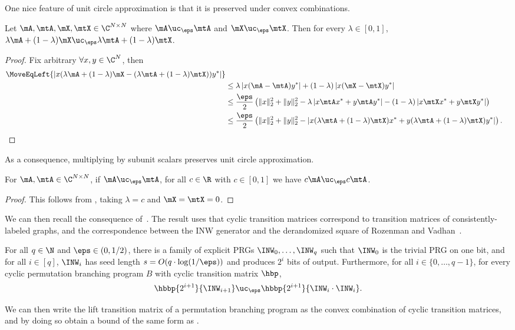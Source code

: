 One nice feature of unit circle approximation is that it is preserved under convex combinations. %
\begin{proposition}\label{prop:UCavg}
    Let $\mA,\mtA ,\mX,\mtX\in \C^{N\times N}$ where $\mA\uc_\eps \mtA$ and $\mX \uc_\eps \mtX$. Then for every $\lambda\in [0,1]$, $\lambda \mA+(1-\lambda)\mX  \uc_\eps \lambda \mtA+(1-\lambda)\mtX$. %
\end{proposition}
\begin{proof}
    Fix arbitrary $\forall x,y \in \C^N$, then
    \begin{align*}
        \MoveEqLeft{\left| x(\lambda \mA+(1-\lambda)\mX -(\lambda \mtA+(1-\lambda)\mtX))y^* \right|}\\
        &\leq \lambda\left|x(\mA-\mtA)y^*\right|+(1-\lambda)\left|x(\mX -\mtX)y^*\right|\\
        &\leq \frac{\eps}{2}\left(\|x\|_2^2+\|y\|_2^2 - \lambda \left|x\mtA x^*+y\mtA y^*\right|-(1-\lambda)\left|x\mtX x^*+y\mtX y^*\right|\right)\\
        &\leq \frac{\eps}{2}\left(\|x\|_2^2+\|y\|_2^2 - \left|x(\lambda \mtA +(1-\lambda)\mtX )x^*+y(\lambda \mtA +(1-\lambda)\mtX )y^*\right|\right). \qedhere
    \end{align*}
\end{proof}
As a consequence, multiplying by subunit scalars preserves unit circle approximation.
\begin{corollary}\label{cor:UCscale}
    For $\mA,\mtA \in \C^{N\times N}$, if $\mA\uc_\eps \mtA$, for all $c \in \R$ with $c\in[0,1]$ we have $c\mA\uc_\eps c\mtA$.
\end{corollary}
\begin{proof}
    This follows from , taking $\lambda=c$ and $\mX=\mtX=0$.
\end{proof}
    
    We can then recall the consequence of~\cite{HozaPyVa21}. The result uses that cyclic transition matrices correspond to transition matrices of consistently-labeled graphs, and the correspondence between the INW generator and the derandomized square of Rozenman and Vadhan~\cite{RozenmanVa05}.
\begin{theorem}\label{thm:HozaPyVa21gen}
    For all $q \in \N$ and $\eps \in (0,1/2)$, there is a family of explicit PRGs $\INW_0,\ldots,\INW_q$ such that $\INW_0$ is the trivial PRG on one bit, and for all $i\in [q]$, $\INW_i$ has seed length $s=O(q\cdot\log(1/\eps))$ and produces $2^i$ bits of output. Furthermore, for all $i \in \{0,\ldots,q-1\}$, for every cyclic permutation branching program $B$ with cyclic transition matrix $\hbp$,
    \[\hbbp{2^{i+1}}{\INW_{i+1}}\uc_{\eps} \hbbp{2^{i+1}}{\INW_i\cdot\INW_i}.\]
\end{theorem}
We can then write the lift transition matrix of a permutation branching program as the convex combination of cyclic transition matrices, and by doing so obtain a bound of the same form as .

